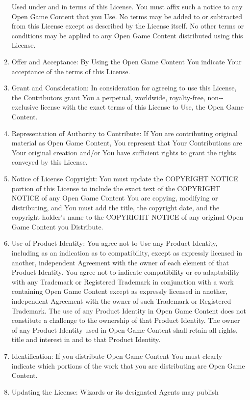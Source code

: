 \documentclass[
]{article}
\begin{document}
\begin{enumerate}
  Used under and in terms of this License. You must affix such a notice
  to any Open Game Content that you Use. No terms may be added to or
  subtracted from this License except as described by the License
  itself. No other terms or conditions may be applied to any Open Game
  Content distributed using this License.
\item
  Offer and Acceptance: By Using the Open Game Content You indicate Your
  acceptance of the terms of this License.
\item
  Grant and Consideration: In consideration for agreeing to use this
  License, the Contributors grant You a perpetual, worldwide,
  royalty-free, non-­exclusive license with the exact terms of this
  License to Use, the Open Game Content.
\item
  Representation of Authority to Contribute: If You are contributing
  original material as Open Game Content, You represent that Your
  Contributions are Your original creation and/or You have sufficient
  rights to grant the rights conveyed by this License.
\item
  Notice of License Copyright: You must update the COPYRIGHT NOTICE
  portion of this License to include the exact text of the COPYRIGHT
  NOTICE of any Open Game Content You are copying, modifying or
  distributing, and You must add the title, the copyright date, and the
  copyright holder's name to the COPYRIGHT NOTICE of any original Open
  Game Content you Distribute.
\item
  Use of Product Identity: You agree not to Use any Product Identity,
  including as an indication as to compatibility, except as expressly
  licensed in another, independent Agreement with the owner of each
  element of that Product Identity. You agree not to indicate
  compatibility or co-adaptability with any Trademark or Registered
  Trademark in conjunction with a work containing Open Game Content
  except as expressly licensed in another, independent Agreement with
  the owner of such Trademark or Registered Trademark. The use of any
  Product Identity in Open Game Content does not constitute a challenge
  to the ownership of that Product Identity. The owner of any Product
  Identity used in Open Game Content shall retain all rights, title and
  interest in and to that Product Identity.
\item
  Identification: If you distribute Open Game Content You must clearly
  indicate which portions of the work that you are distributing are Open
  Game Content.
\item
  Updating the License: Wizards or its designated Agents may publish

\end{enumerate}
\end{document}
